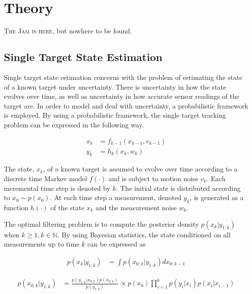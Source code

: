 \chapter{Theory}

\lettrine[lines=4, loversize=-0.1, lraise=0.1]{T}{he Jam is here}, but nowhere to be found.

\section{Single Target State Estimation}\label{sec:STT}

Single target state estimation concerns with the problem of estimating the state of a known target under uncertainty. There is uncertainty in how the state evolves over time, as well as uncertainty in how accurate sensor readings of the target are. In order to model and deal with uncertainty, a probabilistic framework is employed. By using a probabilistic framework, the single target tracking problem can be expressed in the following way. 

\begin{equation}
    \begin{split}
        x_{k} &= f_{k-1}(x_{k-1},v_{k-1}) \\
        y_{k} &= h_k(x_k,w_k) 
    \end{split}\label{eq:mm}
\end{equation}

The state, $x_k$, of a known target is assumed to evolve over time according to a discrete time Markov model $f(\cdot)$ and is subject to motion noise $v_k$. Each incremental time step is denoted by $k$. The initial state is distributed according to $x_0 \sim p(x_0)$. At each time step a measurement, denoted $y_k$, is generated as a function $h(\cdot)$ of the state $x_k$ and the measurement noise $w_k$.

The optimal filtering problem is to compute the posterior density $p(x_k|y_{1:k})$ when $ k \geq 1, k \in \mathbb{N}$. By using Bayesian statistics, the state conditioned on all measurements up to time $k$ can be expressed as

\begin{equation}
    \begin{split}
        p(x_k|y_{1:k}) &= \int p(x_{0:k}|y_{1:k})dx_{0:k-1}
    \end{split}\label{eq:rec1}
\end{equation}

\begin{equation}
    \begin{split}
        p(x_{0:k}|y_{1:k}) &= \frac{p(y_{1:k}|x_{0:k})p(x_{0:k})}{p(y_{1:k})}
        \propto p(x_0)\prod\limits_{i=1}^{k}p(y_i|x_i)p(x_i|x_{i-1})
    \end{split}\label{eq:rec2}
\end{equation}

